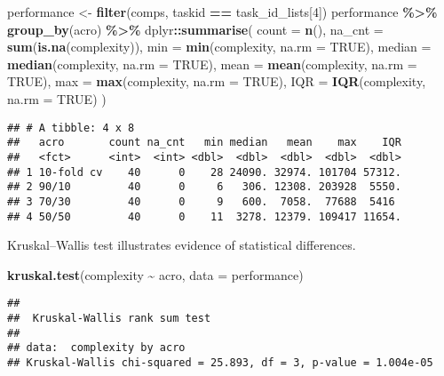 \documentclass[
]{book}
\newenvironment{Shaded}{\begin{snugshade}}{\end{snugshade}}
\newcommand{\AttributeTok}[1]{\textcolor[rgb]{0.13,0.29,0.53}{#1}}
\newcommand{\ConstantTok}[1]{\textcolor[rgb]{0.56,0.35,0.01}{#1}}
\newcommand{\DecValTok}[1]{\textcolor[rgb]{0.00,0.00,0.81}{#1}}
\newcommand{\FunctionTok}[1]{\textcolor[rgb]{0.13,0.29,0.53}{\textbf{#1}}}
\newcommand{\NormalTok}[1]{#1}
\newcommand{\OtherTok}[1]{\textcolor[rgb]{0.56,0.35,0.01}{#1}}
\newcommand{\SpecialCharTok}[1]{\textcolor[rgb]{0.81,0.36,0.00}{\textbf{#1}}}
\begin{document}
\begin{Shaded}
\begin{Highlighting}[]
\NormalTok{performance }\OtherTok{\textless{}{-}} \FunctionTok{filter}\NormalTok{(comps, taskid }\SpecialCharTok{==}\NormalTok{ task\_id\_lists[}\DecValTok{4}\NormalTok{])}
\NormalTok{performance }\SpecialCharTok{\%\textgreater{}\%}
  \FunctionTok{group\_by}\NormalTok{(acro) }\SpecialCharTok{\%\textgreater{}\%}
\NormalTok{  dplyr}\SpecialCharTok{::}\FunctionTok{summarise}\NormalTok{(}
    \AttributeTok{count =} \FunctionTok{n}\NormalTok{(),}
    \AttributeTok{na\_cnt =} \FunctionTok{sum}\NormalTok{(}\FunctionTok{is.na}\NormalTok{(complexity)),}
    \AttributeTok{min =} \FunctionTok{min}\NormalTok{(complexity, }\AttributeTok{na.rm =} \ConstantTok{TRUE}\NormalTok{),}
    \AttributeTok{median =} \FunctionTok{median}\NormalTok{(complexity, }\AttributeTok{na.rm =} \ConstantTok{TRUE}\NormalTok{),}
    \AttributeTok{mean =} \FunctionTok{mean}\NormalTok{(complexity, }\AttributeTok{na.rm =} \ConstantTok{TRUE}\NormalTok{),}
    \AttributeTok{max =} \FunctionTok{max}\NormalTok{(complexity, }\AttributeTok{na.rm =} \ConstantTok{TRUE}\NormalTok{),}
    \AttributeTok{IQR =} \FunctionTok{IQR}\NormalTok{(complexity, }\AttributeTok{na.rm =} \ConstantTok{TRUE}\NormalTok{)}
\NormalTok{  )}
\end{Highlighting}
\end{Shaded}

\begin{verbatim}
## # A tibble: 4 x 8
##   acro       count na_cnt   min median   mean    max    IQR
##   <fct>      <int>  <int> <dbl>  <dbl>  <dbl>  <dbl>  <dbl>
## 1 10-fold cv    40      0    28 24090. 32974. 101704 57312.
## 2 90/10         40      0     6   306. 12308. 203928  5550.
## 3 70/30         40      0     9   600.  7058.  77688  5416 
## 4 50/50         40      0    11  3278. 12379. 109417 11654.
\end{verbatim}

Kruskal--Wallis test illustrates evidence of statistical differences.

\begin{Shaded}
\begin{Highlighting}[]
\FunctionTok{kruskal.test}\NormalTok{(complexity }\SpecialCharTok{\textasciitilde{}}\NormalTok{ acro, }\AttributeTok{data =}\NormalTok{ performance)}
\end{Highlighting}
\end{Shaded}

\begin{verbatim}
## 
##  Kruskal-Wallis rank sum test
## 
## data:  complexity by acro
## Kruskal-Wallis chi-squared = 25.893, df = 3, p-value = 1.004e-05
\end{verbatim}
\end{document}
